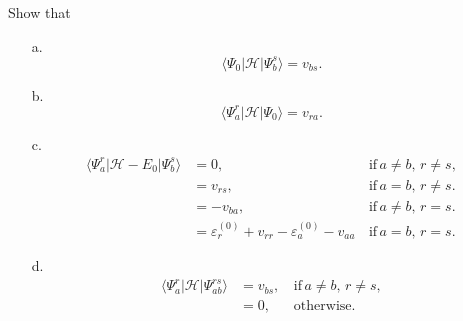 \documentclass[a4paper]{book}
\newcounter{exercise}[chapter]
\begin{document}
	\begin{exercise}
	Show that
	\begin{enumerate}
	
	\item[a.]
	\[
		\langle \Psi_0 | \mathscr{H} | \Psi^s_b \rangle = v_{bs}.
	\]
	
	\item[b.] 
	\[
		\langle \Psi^r_a | \mathscr{H} | \Psi_0 \rangle = v_{ra}.
	\]
	
	\item[c.]
	\begin{align*}
	\langle \Psi^r_a | \mathscr{H} - E_0 | \Psi^s_b \rangle &= 0 , &\,\text{if} \, a\neq b, \, r \neq s, \\
	&= v_{rs} , &\,\text{if} \, a = b , \, r \neq s. \\
	&= -v_{ba} , &\,\text{if} \, a \neq b , \, r = s. \\
	&= \varepsilon^{(0)}_r + v_{rr} - \varepsilon^{(0)}_a - v_{aa} &\, \text{if} \, a = b , \, r = s.
	\end{align*}		
	
	\item[d.] 
	\begin{align*}
	\langle \Psi^r_a | \mathscr{H} | \Psi^{rs}_{ab} \rangle &= v_{bs} , &\,\text{if} \, a \neq b, \, r \neq s, \\
	&=0, &\,\text{otherwise}.
	\end{align*}	
	
	\end{enumerate}
	\end{exercise}
	
\end{document}
